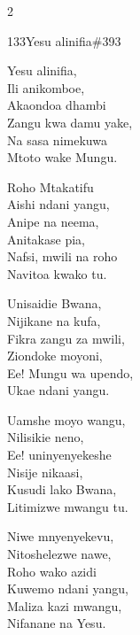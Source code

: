 \begin{multicols}{2}
\begin{hymn}{133}{Yesu alinifia}{\#393}
\begin{stanza}
Yesu alinifia,\\
Ili anikomboe,\\
Akaondoa dhambi\\
Zangu kwa damu yake,\\
Na sasa nimekuwa\\
Mtoto wake Mungu.
\end{stanza}
\begin{stanza}
Roho Mtakatifu\\
Aishi ndani yangu,\\
Anipe na neema,\\
Anitakase pia,\\
Nafsi, mwili na roho\\
Navitoa kwako tu.
\end{stanza}
\begin{stanza}
Unisaidie Bwana,\\
Nijikane na kufa,\\
Fikra zangu za mwili,\\
Ziondoke moyoni,\\
Ee! Mungu wa upendo,\\
Ukae ndani yangu.
\end{stanza}
\begin{stanza}
Uamshe moyo wangu,\\
Nilisikie neno,\\
Ee! uninyenyekeshe\\
Nisije nikaasi,\\
Kusudi lako Bwana,\\
Litimizwe mwangu tu.
\end{stanza}
\begin{stanza}
Niwe mnyenyekevu,\\
Nitoshelezwe nawe,\\
Roho wako azidi\\
Kuwemo ndani yangu,\\
Maliza kazi mwangu,\\
Nifanane na Yesu.
\end{stanza}
\end{hymn}


\end{multicols}
